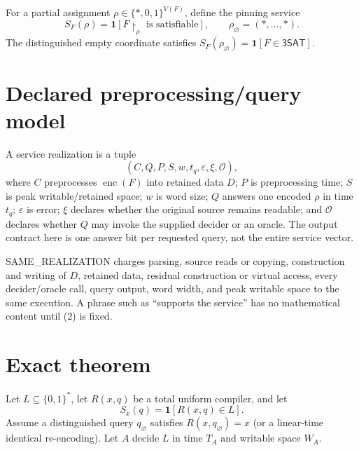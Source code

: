 \documentclass[11pt]{article}
\newcommand{\SAT}{\mathsf{3SAT}}
\begin{document}
For a partial assignment $\rho\in\{*,0,1\}^{V(F)}$, define the pinning
service
\[
 S_F(\rho)=\mathbf 1[F\!\upharpoonright_\rho\text{ is satisfiable}],
 \qquad \rho_\varnothing=(*,\ldots,*).
 \tag{1}
\]
The distinguished empty coordinate satisfies
$S_F(\rho_\varnothing)=\mathbf 1[F\in\SAT]$.

\section{Declared preprocessing/query model}

A service realization is a tuple
\[
 (C,Q,P,S,w,t_q,\varepsilon,\xi,\mathcal O),                 \tag{2}
\]
where $C$ preprocesses $\operatorname{enc}(F)$ into retained data $D$;
$P$ is preprocessing time; $S$ is peak writable/retained space; $w$ is word
size; $Q$ answers one encoded $\rho$ in time $t_q$; $\varepsilon$ is error;
$\xi$ declares whether the original source remains readable; and
$\mathcal O$ declares whether $Q$ may invoke the supplied decider or an
oracle.  The output contract here is one answer bit per requested query, not
the entire service vector.

SAME\_REALIZATION charges parsing, source reads or copying, construction and
writing of $D$, retained data, residual construction or virtual access,
every decider/oracle call, query output, word width, and peak writable space
to the same execution.  A phrase such as ``supports the service'' has no
mathematical content until (2) is fixed.

\section{Exact theorem}

Let $L\subseteq\{0,1\}^*$, let $R(x,q)$ be a total uniform compiler, and let
\[
 S_x(q)=\mathbf 1[R(x,q)\in L].                              \tag{3}
\]
Assume a distinguished query $q_\varnothing$ satisfies
$R(x,q_\varnothing)=x$ (or a linear-time identical re-encoding).  Let $A$
decide $L$ in time $T_A$ and writable space $W_A$.
\end{document}
